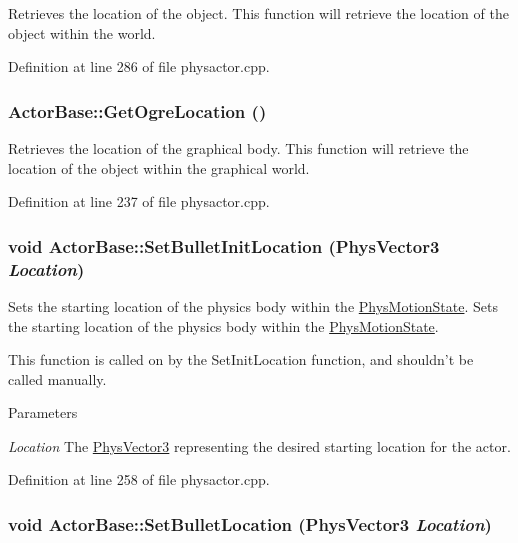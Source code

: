 Retrieves the location of the object. This function will retrieve the location of the object within the world. 

Definition at line 286 of file physactor.cpp.\hypertarget{classActorBase_a73ee03084b2ca78659b6e6439cafa75f}{
\subsubsection[{GetOgreLocation}]{ ActorBase::GetOgreLocation ()}}
\label{dd/d7b/classActorBase_a73ee03084b2ca78659b6e6439cafa75f}


Retrieves the location of the graphical body. This function will retrieve the location of the object within the graphical world. 

Definition at line 237 of file physactor.cpp.\hypertarget{classActorBase_af52177760d530df2b0987ed8626a656d}{
\subsubsection[{SetBulletInitLocation}]{\setlength{\rightskip}{0pt plus 5cm}void ActorBase::SetBulletInitLocation ({\bf PhysVector3} {\em Location})}}
\label{dd/d7b/classActorBase_af52177760d530df2b0987ed8626a656d}


Sets the starting location of the physics body within the \hyperlink{classPhysMotionState}{PhysMotionState}. Sets the starting location of the physics body within the \hyperlink{classPhysMotionState}{PhysMotionState}. \par
 This function is called on by the SetInitLocation function, and shouldn't be called manually. 
\begin{DoxyParams}{Parameters}
\item[{\em Location}]The \hyperlink{classPhysVector3}{PhysVector3} representing the desired starting location for the actor. \end{DoxyParams}


Definition at line 258 of file physactor.cpp.\hypertarget{classActorBase_af64a57138bbd32c52581a5c8d0d29a76}{
\subsubsection[{SetBulletLocation}]{\setlength{\rightskip}{0pt plus 5cm}void ActorBase::SetBulletLocation ({\bf PhysVector3} {\em Location})}}
\label{dd/d7b/classActorBase_af64a57138bbd32c52581a5c8d0d29a76}


